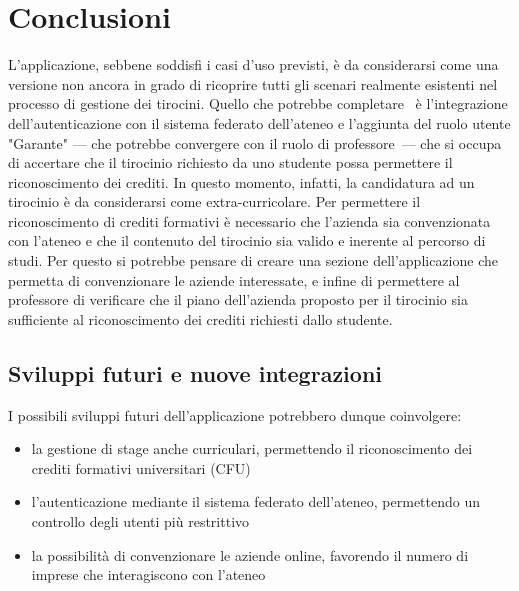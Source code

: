 \chapter{Conclusioni}

L'applicazione, sebbene soddisfi i casi d'uso previsti, è da considerarsi come una versione non ancora in grado di ricoprire tutti gli scenari realmente esistenti nel processo di gestione dei tirocini. Quello che potrebbe completare \projectName~è l'integrazione dell'autenticazione con il sistema federato dell'ateneo e l'aggiunta del ruolo utente "Garante"  --- che potrebbe convergere con il ruolo di professore~--- che si occupa di accertare che il tirocinio richiesto da uno studente possa permettere il riconoscimento dei crediti. In questo momento, infatti, la candidatura ad un tirocinio è da considerarsi come extra-curricolare. 
%
Per permettere il riconoscimento di crediti formativi è necessario che l'azienda sia convenzionata con l'ateneo e che il contenuto del tirocinio sia valido e inerente al percorso di studi. Per questo si potrebbe pensare di creare una sezione dell'applicazione che permetta di convenzionare le aziende interessate, e infine di permettere al professore di verificare che il piano dell'azienda proposto per il tirocinio sia sufficiente al riconoscimento dei crediti richiesti dallo studente.

\section{Sviluppi futuri e nuove integrazioni}
I possibili sviluppi futuri dell'applicazione potrebbero dunque coinvolgere:
\begin{itemize}
	\item la gestione di stage anche curriculari, permettendo il riconoscimento dei crediti formativi universitari (CFU)
	\item l'autenticazione mediante il sistema federato dell'ateneo, permettendo un controllo degli utenti più restrittivo
	\item la possibilità di convenzionare le aziende online, favorendo il numero di imprese che interagiscono con l'ateneo
\end{itemize}
